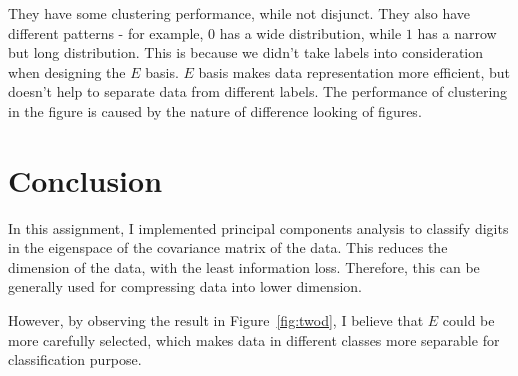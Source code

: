 \documentclass[10pt]{article}
\begin{document}
They have some clustering performance, while not disjunct. They also
have different patterns - for example, $0$ has a wide distribution,
while $1$ has a narrow but long distribution. This is because we
didn't take labels into consideration when designing the $E$ basis.
$E$ basis makes data representation more efficient, but doesn't help
to separate data from different labels. The performance of clustering
in the figure is caused by the nature of difference looking of
figures.

\section{Conclusion}

In this assignment, I implemented principal components analysis to
classify digits in the eigenspace of the covariance matrix of the
data. This reduces the dimension of the data, with the least
information loss. Therefore, this can be generally used for
compressing data into lower dimension.

However, by observing the result in Figure~\ref{fig:twod}, I believe
that $E$ could be more carefully selected, which makes data in
different classes more separable for classification purpose.
\end{document}
